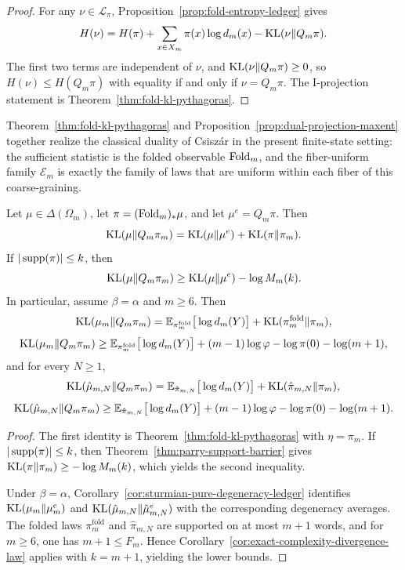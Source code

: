 \begin{proof}
For any \(\nu\in\mathcal L_\pi\),
Proposition~\ref{prop:fold-entropy-ledger} gives
\[
H(\nu)
=
H(\pi)+\sum_{x\in X_m}\pi(x)\log d_m(x)-\operatorname{KL}(\nu\|Q_m\pi).
\]
The first two terms are independent of \(\nu\), and
\(\operatorname{KL}(\nu\|Q_m\pi)\ge 0\), so \(H(\nu)\le H(Q_m\pi)\) with equality if and
only if \(\nu=Q_m\pi\). The I-projection statement is
Theorem~\ref{thm:fold-kl-pythagoras}.
\end{proof}

\begin{remark}\label{rem:fold-kl-pythagoras-classical}
Theorem~\ref{thm:fold-kl-pythagoras} and
Proposition~\ref{prop:dual-projection-maxent} together realize the classical
duality of Csisz\'ar \cite{Csiszar1975IdivergenceGeometry} in the present
finite-state setting: the sufficient statistic is the folded observable
\(\mathrm{Fold}_m\), and the fiber-uniform family \(\mathcal E_m\) is exactly the
family of laws that are uniform within each fiber of this coarse-graining.
\end{remark}

\begin{corollary}\label{cor:microstate-parry-lift-decomposition}
Let \(\mu\in\Delta(\Omega_m)\), let \(\pi=(\mathrm{Fold}_m)_*\mu\), and let
\(\mu^e=Q_m\pi\). Then
\[
\operatorname{KL}(\mu\|Q_m\pi_m)
=
\operatorname{KL}(\mu\|\mu^e)+\operatorname{KL}(\pi\|\pi_m).
\]
If \(|\operatorname{supp}(\pi)|\le k\), then
\[
\operatorname{KL}(\mu\|Q_m\pi_m)
\ge
\operatorname{KL}(\mu\|\mu^e)-\log M_m(k).
\]
In particular, assume \(\beta=\alpha\) and \(m\ge 6\). Then
\[
\operatorname{KL}(\mu_m\|Q_m\pi_m)
=
\mathbb E_{\pi_m^{\mathrm{fold}}}\big[\log d_m(Y)\big]
+\operatorname{KL}(\pi_m^{\mathrm{fold}}\|\pi_m),
\]
\[
\operatorname{KL}(\mu_m\|Q_m\pi_m)
\ge
\mathbb E_{\pi_m^{\mathrm{fold}}}\big[\log d_m(Y)\big]
+(m-1)\log\varphi-\log\pi(0)-\log(m+1),
\]
and for every \(N\ge 1\),
\[
\operatorname{KL}(\hat\mu_{m,N}\|Q_m\pi_m)
=
\mathbb E_{\hat\pi_{m,N}}\big[\log d_m(Y)\big]
+\operatorname{KL}(\hat\pi_{m,N}\|\pi_m),
\]
\[
\operatorname{KL}(\hat\mu_{m,N}\|Q_m\pi_m)
\ge
\mathbb E_{\hat\pi_{m,N}}\big[\log d_m(Y)\big]
+(m-1)\log\varphi-\log\pi(0)-\log(m+1).
\]
\end{corollary}

\begin{proof}
The first identity is Theorem~\ref{thm:fold-kl-pythagoras} with \(\eta=\pi_m\).
If \(|\operatorname{supp}(\pi)|\le k\), then
Theorem~\ref{thm:parry-support-barrier} gives
\(\operatorname{KL}(\pi\|\pi_m)\ge -\log M_m(k)\), which yields the second inequality.

Under \(\beta=\alpha\), Corollary~\ref{cor:sturmian-pure-degeneracy-ledger}
identifies \(\operatorname{KL}(\mu_m\|\mu_m^e)\) and \(\operatorname{KL}(\hat\mu_{m,N}\|\hat\mu_{m,N}^e)\)
with the corresponding degeneracy averages. The folded laws
\(\pi_m^{\mathrm{fold}}\) and \(\hat\pi_{m,N}\) are supported on at most \(m+1\)
words, and for \(m\ge 6\), one has \(m+1\le F_m\). Hence
Corollary~\ref{cor:exact-complexity-divergence-law} applies with \(k=m+1\),
yielding the lower bounds.
\end{proof}
